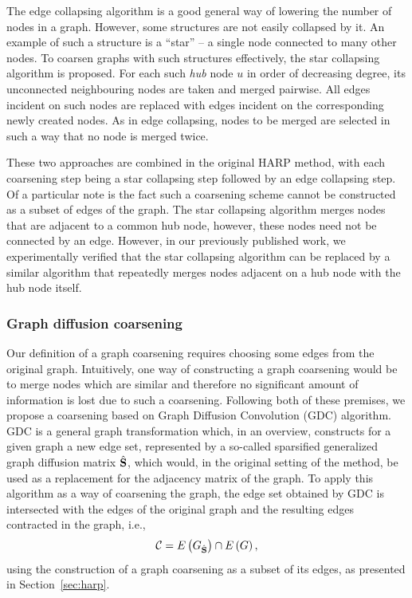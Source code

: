 The edge collapsing algorithm is a good general way of lowering the number of nodes in a graph. However, some structures are not easily collapsed by it. An example of such a structure is a \enquote{star} -- a single node connected to many other nodes. To coarsen graphs with such structures effectively, the star collapsing algorithm is proposed. For each such \textit{hub} node \( u \) in order of decreasing degree, its unconnected neighbouring nodes are taken and merged pairwise. All edges incident on such nodes are replaced with edges incident on the corresponding newly created nodes. As in edge collapsing, nodes to be merged are selected in such a way that no node is merged twice.

These two approaches are combined in the original HARP method, with each coarsening step being a star collapsing step followed by an edge collapsing step. Of a particular note is the fact such a coarsening scheme cannot be constructed as a subset of edges of the graph. The star collapsing algorithm merges nodes that are adjacent to a common hub node, however, these nodes need not be connected by an edge. However, in our previously published work, we experimentally verified that the star collapsing algorithm can be replaced by a similar algorithm that repeatedly merges nodes adjacent on a hub node with the hub node itself.

\subsubsection{Graph diffusion coarsening}\label{sec:gdc-coarsening}

Our definition of a graph coarsening requires choosing some edges from the original graph. Intuitively, one way of constructing a graph coarsening would be to merge nodes which are similar and therefore no significant amount of information is lost due to such a coarsening. Following both of these premises, we propose a coarsening based on Graph Diffusion Convolution (GDC) \cite{gasteiger_diffusion_2019} algorithm. GDC is a general graph transformation which, in an overview, constructs for a given graph a new edge set, represented by a so-called sparsified generalized graph diffusion matrix \( \hat{\mathbf{S}} \), which would, in the original setting of the method, be used as a replacement for the adjacency matrix of the graph. To apply this algorithm as a way of coarsening the graph, the edge set obtained by GDC is intersected with the edges of the original graph and the resulting edges contracted in the graph, i.e.,
\[ \mathcal{C} = E \left( G_{\hat{\mathbf{S}}} \right) \cap E \left( G \right), \]
using the construction of a graph coarsening as a subset of its edges, as presented in Section~\ref{sec:harp}.

